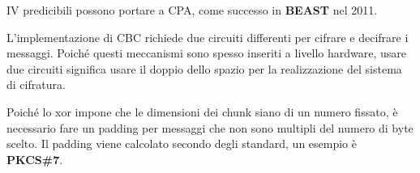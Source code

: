 \begin{remark}
IV predicibili possono portare a CPA, come successo in \textbf{BEAST} nel 2011.
\end{remark}
\begin{remark}
L'implementazione di CBC richiede due circuiti differenti per cifrare e decifrare i messaggi. Poiché questi meccanismi sono spesso inseriti a livello hardware, usare due circuiti significa usare il doppio dello spazio per la realizzazione del sistema di cifratura.
\end{remark}
\begin{remark}
Poiché lo xor impone che le dimensioni dei chunk siano di un numero fissato, è necessario fare un padding per messaggi che non sono multipli del numero di byte scelto. Il padding viene calcolato secondo degli standard, un esempio è \textbf{PKCS\#7}.
\end{remark}
